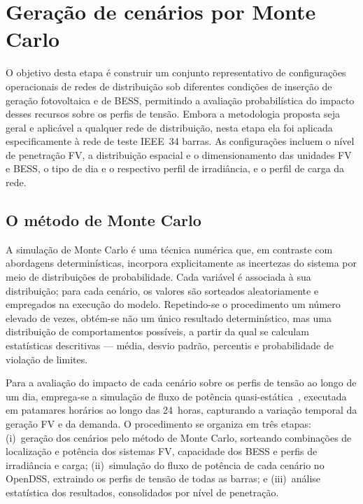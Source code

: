 \chapter{Geração de cenários por Monte Carlo}
\label{cap:cenarios}

O objetivo desta etapa é construir um conjunto representativo de configurações operacionais de redes de 
distribuição 
sob diferentes condições de inserção de geração fotovoltaica e de BESS, permitindo a
avaliação probabilística do impacto desses recursos sobre os perfis de tensão. Embora a metodologia 
proposta seja geral e aplicável a qualquer rede de distribuição, nesta etapa ela foi aplicada 
especificamente à rede de teste IEEE~34 barras. As configurações incluem 
o nível de penetração FV, a distribuição espacial e o dimensionamento das unidades FV e BESS, o tipo de 
dia e o respectivo perfil de irradiância, e o perfil de carga da rede.

\section{O método de Monte Carlo}
\label{sec:montecarlo}

A simulação de Monte Carlo é uma técnica numérica que, em contraste com abordagens determinísticas, incorpora explicitamente as incertezas do sistema por meio de distribuições de probabilidade. Cada variável é associada à sua distribuição; para cada cenário, os valores são sorteados aleatoriamente e empregados na execução do modelo. Repetindo-se o procedimento um número elevado de vezes, obtém-se não um único resultado determinístico, mas uma distribuição de comportamentos possíveis, a partir da qual se calculam estatísticas descritivas --- média, desvio padrão, percentis e probabilidade de violação de limites.

Para a avaliação do impacto de cada cenário sobre os perfis de tensão ao longo de um dia, emprega-se a simulação de fluxo de potência quasi-estática~\cite{cunha2021}, executada em patamares horários ao longo das 24~horas, capturando a variação temporal da geração FV e da demanda. O procedimento se organiza em três etapas: (i)~geração dos cenários pelo método de Monte Carlo, sorteando combinações de localização e potência dos sistemas FV, capacidade dos BESS e perfis de irradiância e carga; (ii)~simulação do fluxo de potência de cada cenário no OpenDSS, extraindo os perfis de tensão de todas as barras; e (iii)~análise estatística dos resultados, consolidados por nível de penetração.

